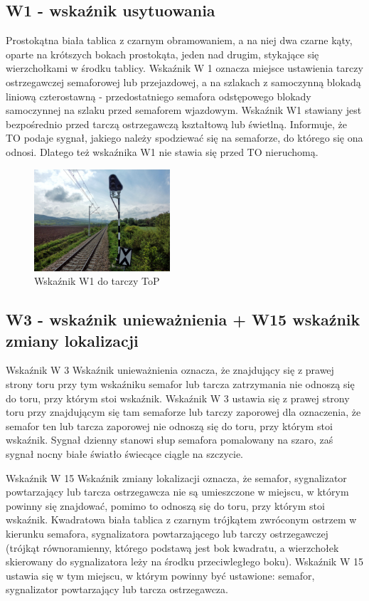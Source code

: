 \subsection{W1 - wskaźnik usytuowania}

Prostokątna biała tablica z czarnym obramowaniem, a na niej dwa czarne kąty, oparte na krótszych bokach prostokąta, jeden nad drugim, stykające się wierzchołkami w środku tablicy. Wskaźnik W 1 oznacza miejsce ustawienia tarczy ostrzegawczej semaforowej lub przejazdowej, a na szlakach z samoczynną blokadą liniową czterostawną - przedostatniego
semafora odstępowego blokady samoczynnej na szlaku przed semaforem wjazdowym. Wskaźnik W1 stawiany jest bezpośrednio przed tarczą ostrzegawczą kształtową lub świetlną. Informuje, że TO podaje sygnał, jakiego należy spodziewać się na semaforze, do którego się ona odnosi. Dlatego też wskaźnika W1 nie stawia się przed TO nieruchomą.

	\begin{figure}
		\includegraphics[width=0.45\textwidth]{skryptkierownik-img/wskaznik-w1.jpg}
		\caption{Wskaźnik W1 do tarczy ToP}
	\end{figure}

\subsection{W3 - wskaźnik unieważnienia + W15 wskaźnik zmiany lokalizacji}

Wskaźnik W 3 {\textquotedbl}Wskaźnik unieważnienia{\textquotedbl} oznacza, że znajdujący się z prawej strony toru przy
tym wskaźniku semafor lub tarcza zatrzymania nie odnoszą się do toru, przy którym stoi wskaźnik. Wskaźnik W 3 ustawia
się z prawej strony toru przy znajdującym się tam semaforze lub tarczy zaporowej dla oznaczenia, że semafor ten lub
tarcza zaporowej nie odnoszą się do toru, przy którym stoi wskaźnik. Sygnał dzienny stanowi słup semafora pomalowany na
szaro, zaś sygnał nocny białe światło świecące ciągle na szczycie.

Wskaźnik W 15 {\textquotedbl}Wskaźnik zmiany lokalizacji{\textquotedbl} oznacza, że semafor, sygnalizator powtarzający lub tarcza ostrzegawcza nie są umieszczone w miejscu, w którym powinny się znajdować, pomimo to odnoszą się do toru, przy którym stoi wskaźnik. Kwadratowa biała tablica z czarnym trójkątem zwróconym ostrzem w kierunku semafora,
sygnalizatora powtarzającego lub tarczy ostrzegawczej (trójkąt równoramienny, którego podstawą jest bok kwadratu, a
wierzchołek skierowany do sygnalizatora leży na środku przeciwległego boku). Wskaźnik W 15 ustawia się w tym miejscu, w
którym powinny być ustawione: semafor, sygnalizator powtarzający lub tarcza ostrzegawcza.

